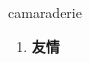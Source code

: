 
\begin{frame}
{\huge camaraderie}
\begin{center}
\begin{enumerate}\Large
  \item \textbf{友情}
\end{enumerate}
\end{center}
\end{frame}
